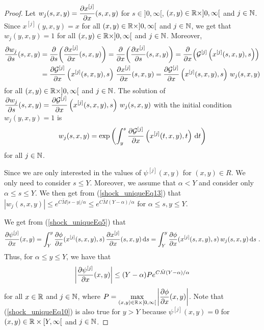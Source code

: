 \begin{proof}
Let $\displaystyle w_j(s,x,y) = \pdydx{x^{[j]}}{x}(s,x,y)$ for
$s\in ]0,\infty[$,
$(x,y) \in \RR \times ]0,\infty[$ and $j \in \NN$.\\
Since $x^{[j]}(y,x,y) = x$ for all $(x,y) \in \RR \times ]0,\infty[$ and
$j \in \NN$, we get that
$\displaystyle w_j(y,x,y) = 1$ for all $(x,y) \in \RR \times ]0,\infty[$
and $j \in \NN$.  Moreover,
\begin{align*}
\pdydx{w_j}{s}(s,x,y) &= \pdfdx{\left(\pdydx{x^{[j]}}{x}(s,x,y)\right)}{s}
= \pdfdx{\left(\pdydx{x^{[j]}}{s}(s,x,y)\right)}{x}
= \pdfdx{\left({\cal G}^{[j]}\left(x^{[j]}(s,x,y),s\right)\right)}{x} \\
&= \pdydx{{\cal G}^{[j]}}{x}\left(x^{[j]}(s,x,y),s\right)\,
\pdydx{x^{[j]}}{x}(s,x,y)
= \pdydx{{\cal G}^{[j]}}{x}\left(x^{[j]}(s,x,y),s\right)\,
w_j(s,x,y)
\end{align*}
for all $(x,y) \in \RR \times ]0,\infty[$ and $j \in \NN$.  The
solution of\\
$\displaystyle \pdydx{w_j}{s}(s,x,y) =
\pdydx{{\cal G}^{[j]}}{x}\left(x^{[j]}(s,x,y),s\right)\, w_j(s,x,y)$
with the initial condition
$\displaystyle w_j(y,x,y) = 1$ is
\[
w_j(s,x,y) = \text{exp}\left(
\int_y^s \pdydx{{\cal G}^{[j]}}{x}\left(x^{[j]}(t,x,y),t\right) \dx{t}\right)
\]
for all $j \in \NN$.

Since we are only interested in the values of
$\displaystyle \psi^{[j]}(x,y)$ for
$(x,y) \in R$.  We only need to consider $s \leq Y$.
Moreover, we assume that $\alpha < Y$ and consider only
$\alpha \leq s \leq Y$.  We then get from (\ref{shock_uniqueEq13}) that
$\displaystyle |w_j(s,x,y)| \leq e^{C\tilde{M}|s-y|/\alpha}
\leq e^{C\tilde{M}(Y-\alpha)/\alpha}$ for $\alpha \leq s,y \leq Y$.

We get from (\ref{shock_uniqueEq5}) that
\[
\pdydx{\psi^{[j]}}{x}(x,y) =
\int_Y^y \pdydx{\phi}{x}(x^{[j]}(s,x,y),s)\,
\pdydx{x^{[j]}}{x}(s,x,y) \dx{s}
=\int_Y^y \pdydx{\phi}{x}(x^{[j]}(s,x,y),s)\, w_j(s,x,y) \dx{s} \ .
\]
Thus, for $\alpha \leq y \leq Y$, we have that
\begin{equation} \label{shock_uniqueEq10}
\left| \pdydx{\psi^{[j]}}{x}(x,y) \right| \leq (Y-\alpha) P 
e^{C\tilde{M}(Y-\alpha)/\alpha}
\end{equation}
for all $x\in \RR$ and $j \in \NN$, where
$\displaystyle P = \max_{(x,y)\in \RR\times [0,\infty[}
\left|\pdydx{\phi}{x}(x,y) \right|$.  Note that
(\ref{shock_uniqueEq10}) is also true for $y>Y$ because
$\displaystyle \psi^{[j]}(x,y) = 0$ for $(x,y) \in \RR\times [Y,\infty[$
and $j \in \NN$.


\end{proof}
